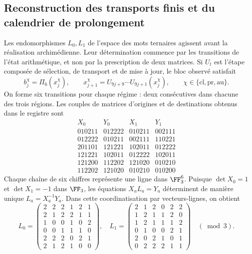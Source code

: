 



\subsection{Reconstruction des transports finis et du calendrier de prolongement}

Les endomorphismes \(L_0,L_1\) de l'espace des mots ternaires agissent avant la réalisation archimédienne. Leur détermination commence par les transitions de l'état arithmétique, et non par la prescription de deux matrices. Si \(U_t\) est l'étape composée de sélection, de transport et de mise à jour, le bloc observé satisfait
\[
 b_j^\chi=\Pi_6(x_j^\chi),\qquad
 x_{j+1}^\chi=U_{9j+9}\cdots U_{9j+1}(x_j^\chi),
 \qquad \chi\in\{\mathrm{cl},\mathrm{pr},\mathrm{au}\}.
\]
On forme six transitions pour chaque régime : deux consécutives dans chacune des trois régions. Les couples de matrices d'origines et de destinations obtenus dans le registre sont
\[
\begin{array}{c|c|c|c}
X_0&Y_0&X_1&Y_1\\\hline
010211&012222&010211&002111\\
012222&010211&002111&110221\\
201101&121221&102011&012222\\
121221&102011&012222&102011\\
121200&112202&121020&010210\\
112202&121020&010210&010200
\end{array}
\]
Chaque chaîne de six chiffres représente une ligne dans \(\FF_3^6\). Puisque \(\det X_0=1\) et \(\det X_1=-1\) dans \(\FF_3\), les équations \(X_aL_a=Y_a\) déterminent de manière unique \(L_a=X_a^{-1}Y_a\). Dans cette coordinatisation par vecteurs-lignes, on obtient
\[
 L_0=\begin{pmatrix}
 2&2&2&1&2&1\\2&1&2&2&1&1\\1&0&0&1&0&2\\
 0&0&1&1&1&0\\2&2&2&0&2&1\\2&1&2&1&0&0
 \end{pmatrix},\quad
 L_1=\begin{pmatrix}
 2&1&2&0&2&2\\1&2&1&1&2&0\\1&2&1&1&1&2\\
 0&1&0&0&2&1\\2&0&2&1&0&1\\0&2&2&2&1&1
 \end{pmatrix}\quad(\bmod3).
\]

